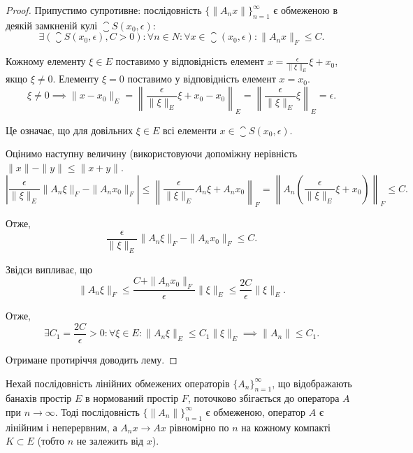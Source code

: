 \begin{proof}
Припустимо супротивне: послідовність
$\{\|A_n x\|\}_{n = 1}^\infty$
є обмеженою в деякій замкненій кулі $\closure S(x_0, \epsilon)$:
\begin{equation*}
    \exists (\closure S(x_0, \epsilon), C > 0):
    \forall n \in N:
    \forall x \in \closure(x_0, \epsilon):
    \|A_n x\|_F \le C.
\end{equation*}

Кожному елементу $\xi \in E$ поставимо у відповідність елемент
$x = \frac{\epsilon}{\|\xi\|_E} \xi + x_0$, якщо $\xi \ne 0$.
Елементу $\xi = 0$ поставимо у відповідність елемент $x = x_0$.
\begin{equation*}
    \xi \ne 0 \implies
    \|x - x_0\|_E =
    \left\| \frac{\epsilon}{\|\xi\|_E} \xi + x_0 - x_0 \right\|_E =
    \left\| \frac{\epsilon}{\|\xi\|_E} \xi \right\|_E =
    \epsilon.
\end{equation*}

Це означає, що для довільних $\xi \in E$ всі елементи
$x \in \closure S(x_0, \epsilon)$.

Оцінимо наступну величину (використовуючи допоміжну
нерівність $\|x\| - \|y\| \le \|x + y\|$.
\begin{equation}
    \left| \frac{\epsilon}{\|\xi\|_E} \|A_n \xi\|_F - \|A_n x_0\|_F \right| \le
    \left\| \frac{\epsilon}{\|\xi\|_E} A_n \xi + A_n x_0 \right\|_F =
    \left\| A_n \left( \frac{\epsilon}{\|\xi\|_E} \xi + x_0 \right) \right\|_F \le C.
\end{equation}

Отже,
\begin{equation*}
    \frac{\epsilon}{\|\xi\|_E} \|A_n \xi\|_F - \|A_n x_0\|_F \le C.
\end{equation*}

Звідси випливає, що
\begin{equation*}
    \|A_n \xi\|_F \le
    \frac{C + \|A_n x_0\|_F}{\epsilon} \|\xi\|_E \le
    \frac{2 C}{\epsilon} \|\xi\|_E.
\end{equation*}

Отже,
\begin{equation*}
    \exists C_1 = \frac{2 C}{\epsilon} > 0:
    \forall \xi \in E:
    \|A_n \xi\|_E \le C_1 \|\xi\|_E \implies
    \|A_n\| \le C_1.
\end{equation*}

Отримане протиріччя доводить лему.
\end{proof}

\begin{theorem}
 Нехай послідовність
лінійних обмежених операторів $\{A_n\}_{n = 1}^\infty$, що відображають
банахів простір $E$ в нормований простір $F$, поточково
збігається до оператора $A$ при $n \to \infty$. Тоді послідовність
$\{\|A_n\|\}_{n = 1}^\infty$ є обмеженою, оператор $A$ є лінійним і
неперервним, а $A_n x \to A x$ рівномірно по $n$ на кожному
компакті $K \subset E$ (тобто $n$ не залежить від $x$).
\end{theorem}

